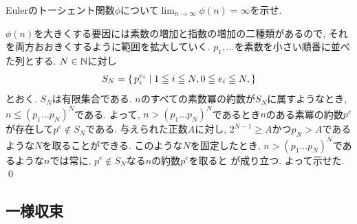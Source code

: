 \begin{egprob} \label{egprob:phi_diverge}
Eulerのトーシェント関数$\phi$について$\lim_{n\to \infty}\phi(n) = \infty$を示せ.
\end{egprob}
\begin{egans}
$\phi(n)$を大きくする要因には素数の増加と指数の増加の二種類があるので, それを両方おおきくするように範囲を拡大していく. $p_1,\dots$を素数を小さい順番に並べた列とする.  $N\in \mathbb{N}$に対し
\[S_N =\set{ p_i^{e_i}\mid 1\leqq i\leqq N, 0\leqq e_i\leqq N,  }\]
とおく. $S_N$は有限集合である. $n$のすべての素数冪の約数が$S_N$に属すようなとき, $n\leq (p_1\dots p_N)^N$である. よって, $n>(p_1\dots p_N)^N$であるとき$n$のある素冪の約数$p^e$が存在して$p^e\notin S_N$である. 与えられた正数$A$に対し, $2^{N-1} \geq A$かつ$p_N >A$であるような$N$を取ることができる. このような$N$を固定したとき, $n>(p_1\dots p_N)^N$であるような$n$では常に, $p^e\notin S_N$なる$n$の約数$p^e$を取ると
が成り立つ. よって示せた. \qed

\end{egans}


\subsection{一様収束}

